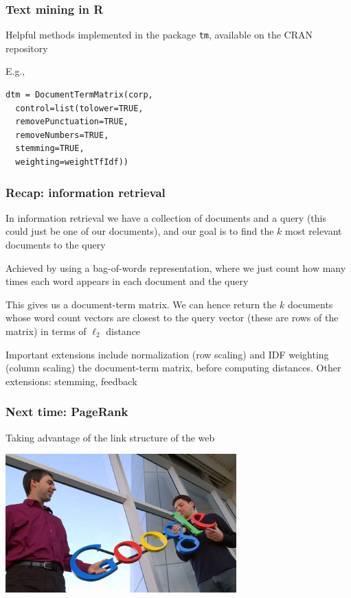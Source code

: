 \documentclass[mathserif]{beamer}
\def\red{\color[rgb]{0.8,0,0}}
\begin{document}
\begin{frame}[fragile]
\frametitle{Text mining in R}

Helpful methods implemented in the package 
{\tt tm}, available on the CRAN repository

\bigskip
E.g.,
\begin{verbatim}
dtm = DocumentTermMatrix(corp, 
  control=list(tolower=TRUE,
  removePunctuation=TRUE,
  removeNumbers=TRUE,
  stemming=TRUE,
  weighting=weightTfIdf))
\end{verbatim}
\end{frame}

\begin{frame}
\frametitle{Recap: information retrieval}
In {\red information retrieval} we have a collection of documents 
and a query (this could just be one of our documents), and our
goal is to find the $k$ most relevant documents to the query

\bigskip
Achieved by using a {\red bag-of-words} representation, where
we just count how many times each word appears in each document
and the query

\bigskip
This gives us a {\red document-term} matrix. We can hence return the
$k$ documents whose word count vectors are closest to the query vector 
(these are rows of the matrix) in terms of $\ell_2$ distance

\bigskip
Important extensions include {\red normalization} (row scaling)
and {\red IDF weighting} (column scaling) the document-term matrix,
before computing distances. Other extensions: stemming, feedback
\end{frame}

\begin{frame}
\frametitle{Next time: PageRank}
Taking advantage of the link structure of the web

\bigskip
\begin{center}
\includegraphics[width=3.5in]{larrysergei.jpg}
\end{center}
\end{frame}
\end{document}

